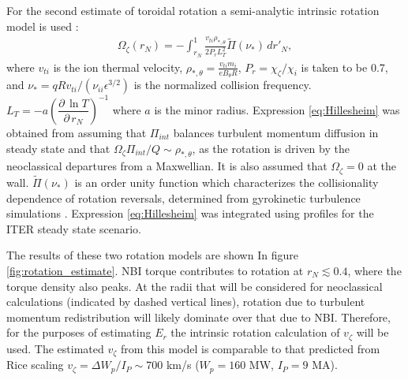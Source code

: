 \documentclass{article}
\newcommand{\partder}[2]{\dfrac{\partial \, #1}{\partial \, #2}} %
\begin{document}
For the second estimate of toroidal rotation a semi-analytic intrinsic rotation model is used \cite{Hillesheim2015}:
\begin{gather}
\Omega_{\zeta}(r_N) = - \int_{r_N}^1 \frac{v_{ti} \rho_{*,\theta}} {2 P_r L_T^2} \widetilde{\Pi} (\nu_*) \, d r'_N,
\end{gather} \label{eq:Hillesheim}
where $v_{ti}$ is the ion thermal velocity, $\rho_{*,\theta} = \frac{v_{ti} m_i}{e B_{\theta}R}$, $P_r = \chi_{\zeta}/\chi_i$ is taken to be 0.7, and $\nu_* = q R v_{ti}/(\nu_{ii} \epsilon^{3/2})$ is the normalized collision frequency. $L_T = - a \left( \partder{\ln T}{r_N} \right)^{-1}$ where $a$ is the minor radius. Expression \ref{eq:Hillesheim} was obtained from assuming that $\Pi_{int}$ balances turbulent momentum diffusion in steady state and that $\Omega_{\zeta} \Pi_{int}/Q \sim \rho_{*, \theta}$, as the rotation is driven by the neoclassical departures from a Maxwellian. It is also assumed that $\Omega_{\zeta} = 0$ at the wall. $\widetilde{\Pi} (\nu_*)$ is an order unity function which characterizes the collisionality dependence of rotation reversals, determined from gyrokinetic turbulence simulations \cite{Barnes2013}. Expression \ref{eq:Hillesheim} was integrated using profiles for the ITER steady state scenario.

The results of these two rotation models are shown In figure \ref{fig:rotation_estimate}. NBI torque contributes to rotation at $r_N \lesssim 0.4$, where the torque density also peaks.  At the radii that will be considered for neoclassical calculations (indicated by dashed vertical lines), rotation due to turbulent momentum redistribution will likely dominate over that due to NBI. Therefore, for the purposes of estimating $E_r$ the intrinsic rotation calculation of $v_{\zeta}$ will be used. The estimated $v_{\zeta}$ from this model is comparable to that predicted from Rice scaling $v_{\zeta} = \Delta W_p/I_P \sim 700$ km/s  ($W_p = 160$ MW, $I_P = 9$ MA). 

\FloatBarrier
\end{document}
